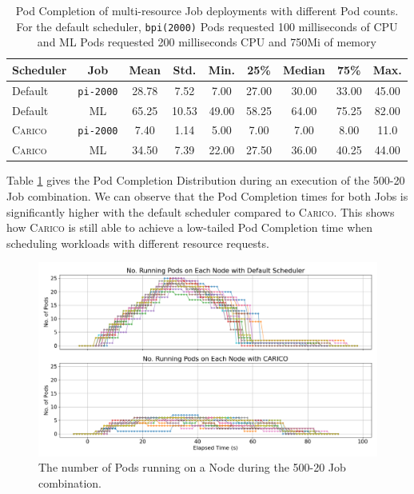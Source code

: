 \begin{table}[ht!]
\centering
    \begin{tabular}{|l|c|c|c|c|c|c|c|c|}
    \hline
        \bfseries Scheduler & \bfseries Job & \bfseries Mean & \bfseries Std. &
        \bfseries Min. & \bfseries 25\% & \bfseries Median & \bfseries 75\% & \bfseries Max. \\
    \hline
        Default & \texttt{pi-2000} & 28.78 & 7.52 & 7.00 & 27.00 & 30.00 & 33.00 & 45.00 \\
        Default & ML & 65.25 & 10.53 & 49.00 & 58.25 & 64.00 & 75.25 & 82.00 \\
        \textsc{Carico} & \texttt{pi-2000} & 7.40 & 1.14 & 5.00 & 7.00 & 7.00 & 8.00 & 11.0 \\
        \textsc{Carico} & ML & 34.50 & 7.39 & 22.00 & 27.50 & 36.00 & 40.25 & 44.00 \\
    \hline
    \end{tabular}
    \caption{Pod Completion of multi-resource Job deployments with different Pod
    counts. For the default scheduler, \texttt{bpi(2000)} Pods requested 100
    milliseconds of CPU and ML Pods requested 200 milliseconds CPU and 750Mi of
    memory}
    \label{tab:mixed-pod-completions}
\end{table}

Table \ref{tab:mixed-pod-completions} gives the Pod Completion Distribution
during an execution of the 500-20 Job combination. We can observe that the
Pod Completion times for both Jobs is significantly higher with the default
scheduler compared to \textsc{Carico}. This shows how \textsc{Carico} is still able to achieve a
low-tailed Pod Completion time when scheduling workloads with different resource
requests.


\begin{figure}[ht!]
    \centering
    \includegraphics[width=\textwidth]{images/mixed-running-pods.png}
    \caption{The number of Pods running on a Node during the
    500-20 Job combination.}
    \label{fig:mixed-pod-running}
\end{figure}

